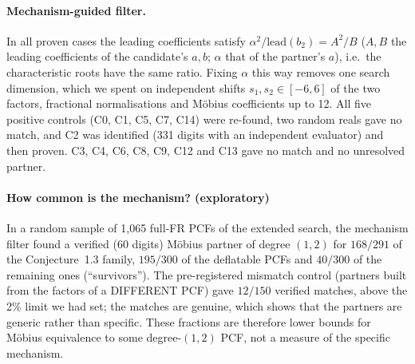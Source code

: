 \documentclass[11pt]{article}
\begin{document}
\paragraph{Mechanism-guided filter.} In all proven cases the leading coefficients satisfy
$\alpha^2/\mathrm{lead}(b_2)=A^2/B$ ($A,B$ the leading coefficients of the candidate's $a,b$; $\alpha$ that of the partner's $a$),
i.e.\ the characteristic roots have the same ratio. Fixing $\alpha$ this way removes one search dimension, which we spent on
independent shifts $s_1,s_2\in[-6,6]$ of the two factors, fractional normalisations and M\"obius coefficients up to 12. All five
positive controls (C0, C1, C5, C7, C14) were re-found, two random reals gave no match, and C2 was identified (331 digits with an
independent evaluator) and then proven. C3, C4, C6, C8, C9, C12 and C13 gave no match and no unresolved partner.

\paragraph{How common is the mechanism? (exploratory)} In a random sample of 1{,}065 full-FR PCFs of the extended search, the
mechanism filter found a verified (60 digits) M\"obius partner of degree $(1,2)$ for $168/291$ of the Conjecture~1.3 family,
$195/300$ of the deflatable PCFs and $40/300$ of the remaining ones (``survivors'').
The pre-registered mismatch control (partners built from the factors of a DIFFERENT PCF) gave $12/150$ verified matches, above
the 2\% limit we had set; the matches are genuine, which shows that the partners are generic rather than specific. These
fractions are therefore lower bounds for M\"obius equivalence to some degree-$(1,2)$ PCF, not a measure of the specific mechanism.
\end{document}
